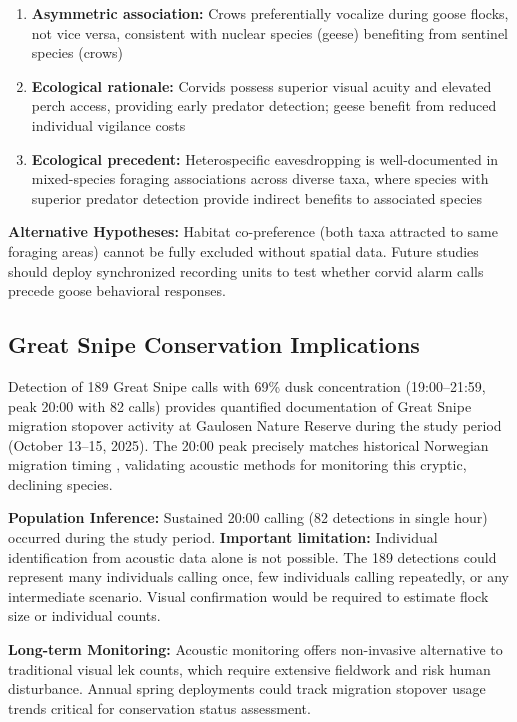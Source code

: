 \documentclass[twocolumn]{article}
\begin{document}
\begin{enumerate}
\item \textbf{Asymmetric association:} Crows preferentially vocalize during goose flocks, not vice versa, consistent with nuclear species (geese) benefiting from sentinel species (crows)

\item \textbf{Ecological rationale:} Corvids possess superior visual acuity and elevated perch access, providing early predator detection; geese benefit from reduced individual vigilance costs \citep{King2023}

\item \textbf{Ecological precedent:} Heterospecific eavesdropping is well-documented in mixed-species foraging associations across diverse taxa, where species with superior predator detection provide indirect benefits to associated species \citep{Magrath2015}
\end{enumerate}

\textbf{Alternative Hypotheses:} Habitat co-preference (both taxa attracted to same foraging areas) cannot be fully excluded without spatial data. Future studies should deploy synchronized recording units to test whether corvid alarm calls precede goose behavioral responses.

\subsection{Great Snipe Conservation Implications}

Detection of 189 Great Snipe calls with 69\% dusk concentration (19:00--21:59, peak 20:00 with 82 calls) provides quantified documentation of Great Snipe migration stopover activity at Gaulosen Nature Reserve during the study period (October 13--15, 2025). The 20:00 peak precisely matches historical Norwegian migration timing \citep{Kålås1995}, validating acoustic methods for monitoring this cryptic, declining species.

\textbf{Population Inference:} Sustained 20:00 calling (82 detections in single hour) occurred during the study period. \textbf{Important limitation:} Individual identification from acoustic data alone is not possible. The 189 detections could represent many individuals calling once, few individuals calling repeatedly, or any intermediate scenario. Visual confirmation would be required to estimate flock size or individual counts.

\textbf{Long-term Monitoring:} Acoustic monitoring offers non-invasive alternative to traditional visual lek counts, which require extensive fieldwork and risk human disturbance. Annual spring deployments could track migration stopover usage trends critical for conservation status assessment.
\end{document}
